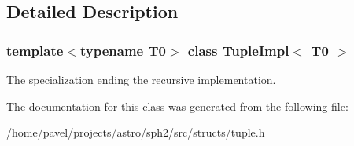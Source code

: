 \subsection{Detailed Description}
\subsubsection*{template$<$typename T0$>$\newline
class Tuple\+Impl$<$ T0 $>$}

The specialization ending the recursive implementation. 

The documentation for this class was generated from the following file\+:\begin{DoxyCompactItemize}
\item 
/home/pavel/projects/astro/sph2/src/structs/tuple.\+h\end{DoxyCompactItemize}
